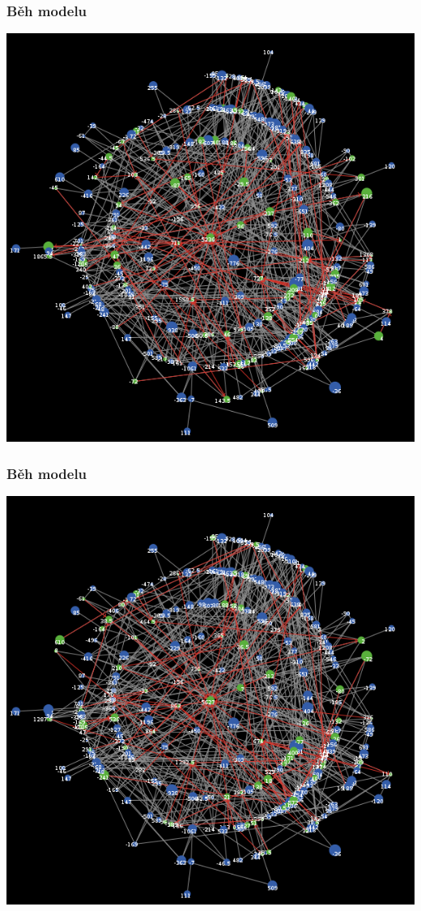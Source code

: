 \documentclass[xcolor=dvipsnames]{beamer}
\begin{document}
  \begin{frame}
    \frametitle{Běh modelu}
    \includegraphics[width=0.6\paperwidth]{14.png}
  \end{frame}
  \begin{frame}
    \frametitle{Běh modelu}
    \includegraphics[width=0.6\paperwidth]{15.png}
  \end{frame}
\end{document}

